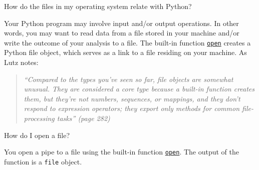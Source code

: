 \documentclass[a4paper,11pt]{book}
\newcommand{\question}[1]{%
    \begin{tcolorbox}[colback=comp_c!10,colframe=comp_c,sidebyside align=top,width=\linewidth,before skip=1ex]
        #1
    \end{tcolorbox}
    \switchcolumn%
}
\newcommand{\note}[1]{%
    \begin{tcolorbox}[colback=white!0,colframe=white!10,width=\linewidth,before skip=1ex]
        #1
    \end{tcolorbox}
}
\begin{document}
\begin{paracol}{2}
	\question{\raggedright How do the files in my operating system relate with Python?}
	\note{Your Python program may involve input and/or output operations. In other words, you may want to read data from a file stored in your machine and/or write the outcome of your analysis to a file. The built-in function \href{https://docs.python.org/3/library/functions.html\#open}{\texttt{open}} creates a Python file object, which serves as a link to a file residing on your machine. As Lutz notes:
	\begin{quote}
		\textit{
		``Compared to the types you've seen so far, file objects are somewhat unusual. They are considered a core type because a built-in function creates them, but they're not numbers, sequences, or mappings, and they don't respond to expression operators; they export only methods for common file-processing tasks'' (page 282)
		}
	\end{quote}}
\end{paracol}

\begin{paracol}{2}
\question{\raggedright How do I open a file?}
\note{You open a pipe to a file using the built-in function \href{https://docs.python.org/3/library/functions.html\#open}{\texttt{open}}. The output of the function is a \texttt{file} object. }
\end{paracol}
\end{document}
